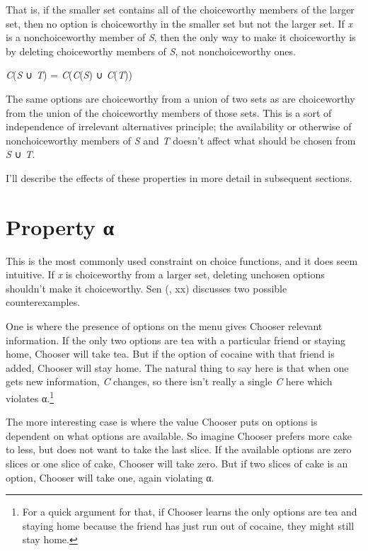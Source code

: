 \documentclass[
  11pt,
  letterpaper,
  DIV=11,
  numbers=noendperiod,
  twoside]{scrartcl}
\providecommand{\tightlist}{%
  \setlength{\itemsep}{0pt}\setlength{\parskip}{0pt}}
\begin{document}
That is, if the smaller set contains all of the choiceworthy members of
the larger set, then no option is choiceworthy in the smaller set but
not the larger set. If \emph{x} is a nonchoiceworthy member of \emph{S},
then the only way to make it choiceworthy is by deleting choiceworthy
members of \emph{S}, not nonchoiceworthy ones.

\begin{description}
\tightlist
\item[Path Independence]
\emph{C}(\emph{S} ∪ \emph{T}) = \emph{C}(\emph{C}(\emph{S}) ∪
\emph{C}(\emph{T}))
\end{description}

The same options are choiceworthy from a union of two sets as are
choiceworthy from the union of the choiceworthy members of those sets.
This is a sort of independence of irrelevant alternatives principle; the
availability or otherwise of nonchoiceworthy members of \emph{S} and
\emph{T} doesn't affect what should be chosen from \emph{S} ∪ \emph{T}.

I'll describe the effects of these properties in more detail in
subsequent sections.

\section{Property α}\label{sec-alpha}

This is the most commonly used constraint on choice functions, and it
does seem intuitive. If \emph{x} is choiceworthy from a larger set,
deleting unchosen options shouldn't make it choiceworthy. Sen
(, xx) discusses two possible
counterexamples.

One is where the presence of options on the menu gives Chooser relevant
information. If the only two options are tea with a particular friend or
staying home, Chooser will take tea. But if the option of cocaine with
that friend is added, Chooser will stay home. The natural thing to say
here is that when one gets new information, \emph{C} changes, so there
isn't really a single \emph{C} here which violates α.\footnote{For a
  quick argument for that, if Chooser learns the only options are tea
  and staying home because the friend has just run out of cocaine, they
  might still stay home.}

The more interesting case is where the value Chooser puts on options is
dependent on what options are available. So imagine Chooser prefers more
cake to less, but does not want to take the last slice. If the available
options are zero slices or one slice of cake, Chooser will take zero.
But if two slices of cake is an option, Chooser will take one, again
violating α.
\end{document}
